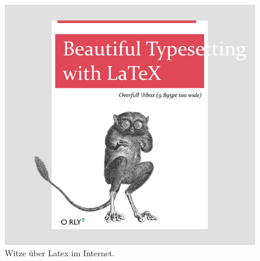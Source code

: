 \begin{program}
\caption{\latex\ Quelltext zu Abbildung \ref{fig:latexinternet}.}
\label{prog:footnotemark}
%
\begin{LaTeXCode}
\begin{figure}
\centering
\includegraphics[width=.85\textwidth]{LatexInternet}
\caption[]{Witze über Latex im Internet.\footnotemark }
\label{fig:latexinternet}
\end{figure}
\end{LaTeXCode}
%
\end{program}


